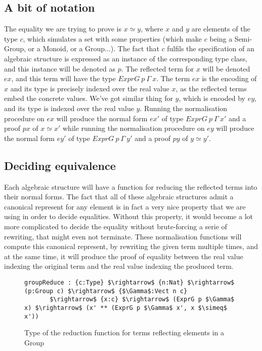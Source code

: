 	\subsection {A bit of notation}
The equality we are trying to prove is $x \simeq y$, where $x$ and $y$ are elements of the type $c$, which  simulates a set with some properties (which make $c$ being a Semi-Group, or a Monoid, or a Group...). The fact that $c$ fulfils the specification of an algebraic structure is expressed as an instance of the corresponding type class, and this instance will be denoted as $p$.
The reflected term for $x$ will be denoted $ex$, and this term will have the type $ExprG\ p\ \Gamma\ x$. The term $ex$ is the encoding of $x$ and its type is precisely indexed over the real value $x$, as the reflected terms embed the concrete values.
We've got similar thing for $y$, which is encoded by $ey$, and its type is indexed over the real value $y$.
Running the normalisation procedure on $ex$ will produce the normal form $ex'$ of type $ExprG\ p\ \Gamma\ x'$ and a proof $px$ of $x \simeq x'$ while running the normalisation procedure on $ey$ will produce the normal form $ey'$ of type $ExprG\ p\ \Gamma\ y'$ and a proof $py$ of $y \simeq y'$.

	\subsection {Deciding equivalence}
	
Each algebraic structure will have a function for reducing the reflected terms into their normal forms. The fact that all of these algebraic structures admit a canonical represent for any element is in fact a very nice property that we are using in order to decide equalities. Without this property, it would become a lot more complicated to decide the equality without brute-forcing a serie of rewriting, that might even not terminate.
These normalisation functions will compute this canonical represent, by rewriting the given term multiple times, and at the same time, it will produce the proof of equality between the real value indexing the original term and the real value indexing the produced term.

\begin{figure}[H]
\figrule
\begin{center}
\begin{lstlisting}
groupReduce : {c:Type} $\rightarrow$ {n:Nat} $\rightarrow$ (p:Group c) $\rightarrow$ {$\Gamma$:Vect n c} 
	   $\rightarrow$ {x:c} $\rightarrow$ (ExprG p $\Gamma$ x) $\rightarrow$ (x' ** (ExprG p $\Gamma$ x', x $\simeq$ x'))
\end{lstlisting}
\end{center}
\caption{Type of the reduction function for terms reflecting elements in a Group}
\label{groupReduce}
\figrule
\end{figure}

